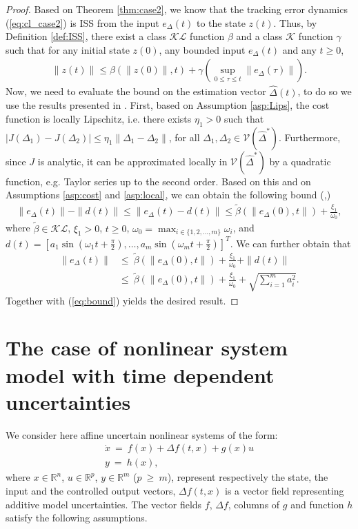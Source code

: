 \documentclass[twoside,leqno,onecolumn]{article}
\begin{document}
\begin{proof}
Based on Theorem \ref{thm:case2}, we know that the tracking error
dynamics (\ref{eq:cl_case2}) is ISS from the input $e_\Delta(t)$
to the state $z(t)$. Thus, by Definition \ref{def:ISS}, there
exist a class $\mathcal{KL}$ function $\beta$ and a class
$\mathcal{K}$ function $\gamma$ such that for any initial state
$z(0)$, any bounded input $e_\Delta(t)$ and any $t\geq0$,
\begin{align}
\label{eq:bound}
\|z(t)\|\leq \beta(\|z(0)\|,t) + \gamma(\sup_{0\leq\tau\leq t} \|e_\Delta(\tau)\|).
\end{align}
Now, we need to evaluate the bound on the estimation vector
$\widehat{\Delta}(t)$, to do so we use the results presented in
\cite{Rote00}. First, based on Assumption \ref{asp:Lips}, the cost
function is locally Lipschitz, i.e. there exists $\eta_1>0$ such
that $|J(\Delta_1)-J(\Delta_2)|\leq\eta_1\|\Delta_1 -\Delta_2\|$,
for all $\Delta_1, \Delta_2 \in\mathcal{V}(\widehat{\Delta}^*)$.
Furthermore, since $J$ is analytic, it can be approximated locally
in $\mathcal{V}(\widehat{\Delta}^*)$ by a quadratic function, e.g.
Taylor series up to the second order. Based on this and on
Assumptions \ref{asp:cost} and \ref{asp:local}, we can obtain the
following bound (\cite[p. 436-437]{Rote00},\cite{BA13})
\begin{align*}
\|e_\Delta(t)\| - \|d(t)\| \leq \|e_\Delta(t)- d(t)\|\leq\tilde{\beta}(\|e_\Delta(0),t\|) + \frac{\xi_1}{\omega_0},
\end{align*}
where $\tilde{\beta}\in\mathcal{KL}$, $\xi_1>0$, $t\geq0$,
$\omega_0 = \max_{i\in\{1,2,\dots,m\}} \omega_i$, and $d(t) =
[a_1\sin(\omega_1 t + \frac{\pi}{2}),\dots,a_m\sin(\omega_m
t+\frac{\pi}{2})]^T$. We can further obtain that
\begin{align*}
\|e_\Delta(t)\|&\leq~ \tilde{\beta}(\|e_\Delta(0),t\|) + \frac{\xi_1}{\omega_0} + \|d(t)\|\\
&\leq~\tilde{\beta}(\|e_\Delta(0),t\|) + \frac{\xi_1}{\omega_0} + \sqrt{\sum_{i = 1}^m a_i^2}.
\end{align*}
Together with (\ref{eq:bound}) yields the desired result.
\end{proof}



\section{The case of nonlinear system model with time dependent
uncertainties} We consider here affine uncertain nonlinear systems
of the form:
\begin{equation}
\begin{array}{l}
\displaystyle \dot{x} ~=~ f(x) + \Delta f(t,x) + g(x)u\\
\displaystyle y~=~ h(x),
\end{array}
\label{eq:model}
\end{equation}
where $x\in\mathbb{R}^n$, $u\in \mathbb{R}^p$, $y\in\mathbb{R}^m$
($p~\geq~ m$), represent respectively the state, the input and the
controlled output vectors, $\Delta f(t,x)$ is a vector field
representing additive model uncertainties. The vector fields $f$,
$\Delta f$, columns of $g$ and function $h$ satisfy the following
assumptions.
\end{document}
